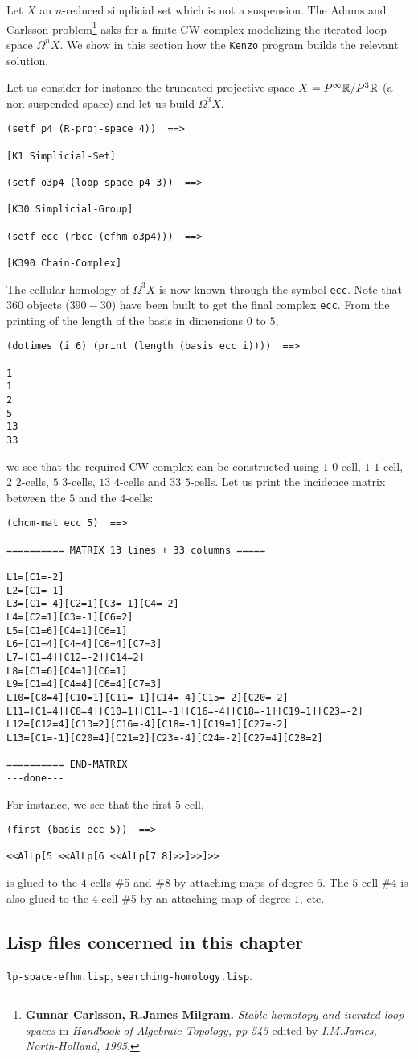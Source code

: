 Let $X$ an $n$-reduced simplicial set which is not a suspension. 
The Adams and Carlsson
problem\footnote{{\bf Gunnar Carlsson, R.James Milgram.} {\em Stable homotopy and iterated loop spaces}  in 
{\em Handbook of Algebraic Topology, pp 545} edited by {\em I.M.James, North-Holland, 1995}.}
asks for a finite CW-complex modelizing the iterated loop space $\Omega^n X$. We show in this section
how the {\tt Kenzo} program builds the relevant solution.\par
Let us consider for instance the truncated projective space $X=P^\infty {{\Bbb R}}/ P^3 {{\Bbb R}}$ (a non-suspended space)
and let us build $\Omega^3 X$.
{\footnotesize\begin{verbatim}
(setf p4 (R-proj-space 4))  ==>

[K1 Simplicial-Set]

(setf o3p4 (loop-space p4 3))  ==>

[K30 Simplicial-Group]

(setf ecc (rbcc (efhm o3p4)))  ==>

[K390 Chain-Complex]
\end{verbatim}}
The cellular homology of $\Omega^3 X$ is now known through the symbol {\tt ecc}. Note that $360$ objects
($390-30$) have been built to get the final complex {\tt ecc}. From the printing of the length of the
basis in dimensions $0$ to $5$,
{\footnotesize\begin{verbatim}
(dotimes (i 6) (print (length (basis ecc i))))  ==>

1 
1 
2 
5 
13 
33 
\end{verbatim}}
we see that the required CW-complex can be constructed using $1$ $0$-cell, $1$ $1$-cell, $2$ $2$-cells,
$5$ $3$-cells, $13$ $4$-cells and $33$ $5$-cells. Let us print the incidence matrix between
the $5$ and the $4$-cells:
\newpage
{\footnotesize\begin{verbatim}
(chcm-mat ecc 5)  ==>

========== MATRIX 13 lines + 33 columns =====

L1=[C1=-2]
L2=[C1=-1]
L3=[C1=-4][C2=1][C3=-1][C4=-2]
L4=[C2=1][C3=-1][C6=2]
L5=[C1=6][C4=1][C6=1]
L6=[C1=4][C4=4][C6=4][C7=3]
L7=[C1=4][C12=-2][C14=2]
L8=[C1=6][C4=1][C6=1]
L9=[C1=4][C4=4][C6=4][C7=3]
L10=[C8=4][C10=1][C11=-1][C14=-4][C15=-2][C20=-2]
L11=[C1=4][C8=4][C10=1][C11=-1][C16=-4][C18=-1][C19=1][C23=-2]
L12=[C12=4][C13=2][C16=-4][C18=-1][C19=1][C27=-2]
L13=[C1=-1][C20=4][C21=2][C23=-4][C24=-2][C27=4][C28=2]

========== END-MATRIX
---done---
\end{verbatim}}
For instance, we see that the first $5$-cell,
{\footnotesize\begin{verbatim}
(first (basis ecc 5))  ==>

<<AlLp[5 <<AlLp[6 <<AlLp[7 8]>>]>>]>>
\end{verbatim}}
is glued to the $4$-cells \#5 and \#8 by attaching  maps of degree $6$.
The $5$-cell \#4 is also glued to the $4$-cell \#5 by an attaching map 
of degree $1$, etc.

\subsection* {Lisp files concerned in this chapter}

{\tt lp-space-efhm.lisp}, {\tt searching-homology.lisp}.


